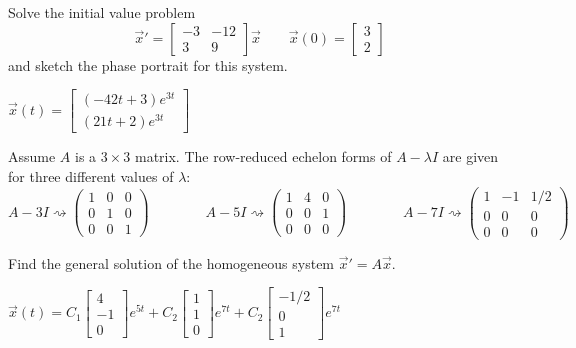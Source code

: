 \begin{exercise}
Solve the initial value problem
\[ {\vec{x}}' = \begin{bmatrix} -3 & -12 \\ 3 & 9 \end{bmatrix}\vec{x} \qquad \vec{x}(0) = \begin{bmatrix} 3 \\ 2  \end{bmatrix} \] and sketch the phase portrait for this system.
\end{exercise}
\comboSol{%
}
{%
$\vec{x}(t) = \left[\begin{smallmatrix} (-42t+3)e^{3t} \\ (21t + 2)e^{3t} \end{smallmatrix}\right]$ \hfill{}\hfill\hfill
}

\begin{exercise}
Assume $A$ is a $3\times 3$ matrix. The row-reduced echelon forms of $A-\lambda I$ are given for three different values of $\lambda$:
$$A-3I \rightsquigarrow \begin{pmatrix} 1&0&0\\ 0&1&0\\ 0&0&1 \end{pmatrix} \qquad\qquad 
A-5I \rightsquigarrow \begin{pmatrix} 1&4&0\\ 0&0&1\\ 0&0&0 \end{pmatrix}\qquad\qquad
A-7I \rightsquigarrow \begin{pmatrix} 1&-1&1/2\\ 0&0&0\\ 0&0&0 \end{pmatrix}$$

Find the general solution of the homogeneous system $\vec{x}'=A\vec{x}$.
\end{exercise}
\comboSol{%
}
{%
$\vec{x}(t) = C_1\left[\begin{smallmatrix} 4 \\ -1 \\ 0 \end{smallmatrix}\right]e^{5t} + C_2\left[\begin{smallmatrix} 1 \\ 1 \\ 0 \end{smallmatrix}\right]e^{7t} + C_2\left[\begin{smallmatrix} -1/2 \\ 0 \\ 1 \end{smallmatrix}\right]e^{7t}$
}


